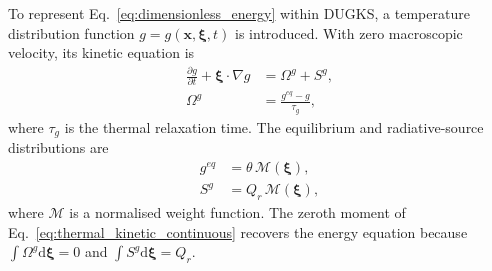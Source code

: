 \documentclass[a4paper,12pt]{ctexart}
\numberwithin{equation}{section}
\newcommand{\vb}[1]{\bm{#1}}
\newcommand{\vx}{\vb{x}}
\newcommand{\vxi}{\bm{\xi}}
\newcommand{\dd}{\mathrm{d}}
\begin{document}
To represent Eq.~\eqref{eq:dimensionless_energy} within DUGKS, a temperature distribution function $g=g(\vx,\vxi,t)$ is introduced. With zero macroscopic velocity, its kinetic equation is
\begin{equation}
\begin{aligned}
\frac{\partial g}{\partial t}+\vxi\cdot\nabla g&=\Omega^g+S^g,
\\
\Omega^g&=\frac{g^{eq}-g}{\tau_g},
\end{aligned}
\label{eq:thermal_kinetic_continuous}
\end{equation}
where $\tau_g$ is the thermal relaxation time. The equilibrium and radiative-source distributions are
\begin{equation*}
\begin{aligned}
g^{eq}&=\theta\,\mathcal{M}(\vxi),
\\
S^g&=Q_r\,\mathcal{M}(\vxi),
\end{aligned}
\end{equation*}
where $\mathcal{M}$ is a normalised weight function. The zeroth moment of Eq.~\eqref{eq:thermal_kinetic_continuous} recovers the energy equation because $\int\Omega^g\dd\vxi=0$ and $\int S^g\dd\vxi=Q_r$.
\end{document}

